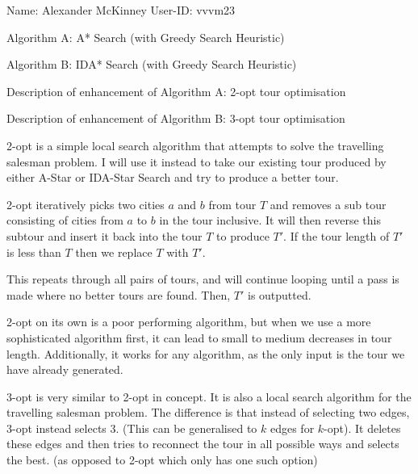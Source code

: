 \documentclass[11pt,a4paper]{article}
\begin{document}
Name: Alexander McKinney \hspace{200pt} User-ID: vvvm23

Algorithm A: A* Search (with Greedy Search Heuristic)

Algorithm B: IDA* Search (with Greedy Search Heuristic)

\vspace{10pt}

Description of enhancement of Algorithm A: 2-opt tour optimisation

Description of enhancement of Algorithm B: 3-opt tour optimisation

\vspace{5pt}


\noindent\hrulefill

\vspace{5pt}

2-opt is a simple local search algorithm that attempts to solve the travelling salesman problem. I will use it instead to take our existing tour produced by either A-Star or IDA-Star Search and try to produce a better tour.

2-opt iteratively picks two cities $a$ and $b$ from tour $T$ and removes a sub tour consisting of cities from $a$ to $b$ in the tour inclusive. It will then reverse this subtour and insert it back into the tour $T$ to produce $T'$. If the tour length of $T'$ is less than $T$ then we replace $T$ with $T'$.

This repeats through all pairs of tours, and will continue looping until a pass is made where no better tours are found. Then, $T'$ is outputted.

2-opt on its own is a poor performing algorithm, but when we use a more sophisticated algorithm first, it can lead to small to medium decreases in tour length. Additionally, it works for any algorithm, as the only input is the tour we have already generated.

\vspace{5pt}

\noindent\hrulefill

\vspace{5pt}


3-opt is very similar to 2-opt in concept. It is also a local search algorithm for the travelling salesman problem. The difference is that instead of selecting two edges, 3-opt instead selects 3. (This can be generalised to $k$ edges for $k$-opt). It deletes these edges and then tries to reconnect the tour in all possible ways and selects the best. (as opposed to 2-opt which only has one such option)
\end{document}
